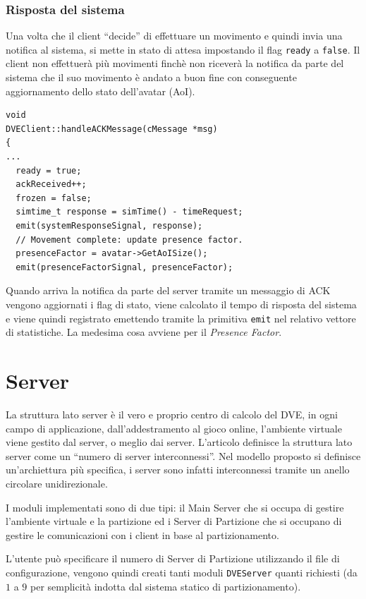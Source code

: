 \documentclass[a4paper, 11pt, oneside]{book}
\theoremstyle{definition}
\theoremstyle{remark}
\begin{document}
\subsubsection{Risposta del sistema}
Una volta che il client ``decide'' di effettuare un movimento e quindi invia
una notifica al sistema, si mette in stato di attesa impostando il flag
\texttt{ready} a \texttt{false}. Il client non effettuerà più movimenti finchè
non riceverà la notifica da parte del sistema che il suo movimento è andato a
buon fine con conseguente aggiornamento dello stato dell'avatar (AoI).
\begin{lstlisting}
void
DVEClient::handleACKMessage(cMessage *msg)
{
...
  ready = true;
  ackReceived++;
  frozen = false;
  simtime_t response = simTime() - timeRequest;
  emit(systemResponseSignal, response);
  // Movement complete: update presence factor.
  presenceFactor = avatar->GetAoISize();
  emit(presenceFactorSignal, presenceFactor);
\end{lstlisting}
Quando arriva la notifica da parte del server tramite un messaggio di ACK
vengono aggiornati i flag di stato, viene calcolato il tempo di risposta
del sistema e viene quindi registrato emettendo tramite la primitiva
\texttt{emit} nel relativo vettore di statistiche. La medesima cosa avviene
per il \emph{Presence Factor}.

\section{Server}
La struttura lato server è il vero e proprio centro di calcolo del DVE, in
ogni campo di applicazione, dall'addestramento al gioco online, l'ambiente
virtuale viene gestito dal server, o meglio dai server.
L'articolo
\cite{IDVE}
definisce la struttura lato server come un ``numero di
server interconnessi''. Nel modello proposto si definisce un'archiettura più
specifica, i server sono infatti interconnessi tramite un anello circolare
unidirezionale.

I moduli implementati sono di due tipi: il Main Server che si occupa di gestire
l'ambiente virtuale e la partizione ed i Server di Partizione che si occupano
di gestire le comunicazioni con i client in base al partizionamento.

L'utente può specificare il numero di Server di Partizione
utilizzando il file di configurazione, vengono quindi creati tanti moduli
\texttt{DVEServer} quanti richiesti (da $1$ a $9$ per semplicità
indotta dal sistema statico di partizionamento).
\end{document}

